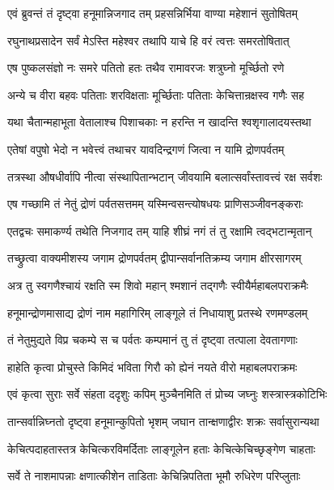 \twolineshloka
{एवं ब्रुवन्तं तं दृष्ट्वा हनूमान्निजगाद तम्}
{प्रहसन्निर्भिया वाण्या महेशानं सुतोषितम्}%


\twolineshloka
{रघुनाथप्रसादेन सर्वं मेऽस्ति महेश्वर}
{तथापि याचे हि वरं त्वत्तः समरतोषितात्}%

\twolineshloka
{एष पुष्कलसंज्ञो नः समरे पतितो हतः}
{तथैव रामावरजः शत्रुघ्नो मूर्च्छितो रणे}%

\twolineshloka
{अन्ये च वीरा बहवः पतिताः शरविक्षताः}
{मूर्च्छिताः पतिताः केचित्तान्रक्षस्व गणैः सह}%

\twolineshloka
{यथा चैतान्महाभूता वेतालाश्च पिशाचकाः}
{न हरन्ति न खादन्ति श्वशृगालादयस्तथा}%

\twolineshloka
{एतेषां वपुषो भेदो न भवेत्त्वं तथाचर}
{यावदिन्द्रगणं जित्वा न यामि द्रोणपर्वतम्}%

\twolineshloka
{तत्रस्था औषधीर्वापि नीत्वा संस्थापितान्भटान्}
{जीवयामि बलात्सर्वांस्तावत्त्वं रक्ष सर्वशः}%

\twolineshloka
{एष गच्छामि तं नेतुं द्रोणं पर्वतसत्तमम्}
{यस्मिन्वसन्त्योषधयः प्राणिसञ्जीवनङ्कराः}%

\twolineshloka
{एतद्वचः समाकर्ण्य तथेति निजगाद तम्}
{याहि शीघ्रं नगं तं तु रक्षामि त्वद्भटान्मृतान्}%

\twolineshloka
{तच्छ्रुत्वा वाक्यमीशस्य जगाम द्रोणपर्वतम्}
{द्वीपान्सर्वानतिक्रम्य जगाम क्षीरसागरम्}%

\twolineshloka
{अत्र तु स्वगणैश्चायं रक्षति स्म शिवो महान्}
{श्मशानं तद्गणैः स्वीयैर्महाबलपराक्रमैः}%

\twolineshloka
{हनूमान्द्रोणमासाद्य द्रोणं नाम महागिरिम्}
{लाङ्गूले तं निधायाशु प्रतस्थे रणमण्डलम्}%

\twolineshloka
{तं नेतुमुद्यते विप्र चकम्पे स च पर्वतः}
{कम्पमानं तु तं दृष्ट्वा तत्पाला देवतागणाः}%

\twolineshloka
{हाहेति कृत्वा प्रोचुस्ते किमिदं भविता गिरौ}
{को ह्येनं नयते वीरो महाबलपराक्रमः}%

\twolineshloka
{एवं कृत्वा सुराः सर्वे संहता ददृशुः कपिम्}
{मुञ्चैनमिति तं प्रोच्य जघ्नुः शस्त्रास्त्रकोटिभिः}%

\twolineshloka
{तान्सर्वान्निघ्नतो दृष्ट्वा हनूमान्कुपितो भृशम्}
{जघान तान्क्षणाद्वीरः शक्रः सर्वासुरान्यथा}%

\twolineshloka
{केचित्पदाहतास्तत्र केचित्करविमर्दिताः}
{लाङ्गूलेन हताः केचित्केचिच्छृङ्गेण चाहताः}%

\twolineshloka
{सर्वे ते नाशमापन्नाः क्षणात्कीशेन ताडिताः}
{केचिन्निपतिता भूमौ रुधिरेण परिप्लुताः}%

